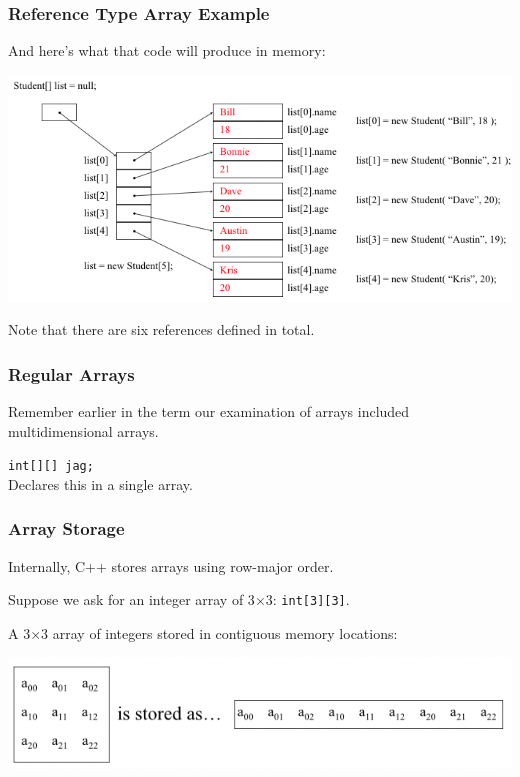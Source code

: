 \begin{frame}
\frametitle{Reference Type Array Example}

And here's what that code will produce in memory:

\begin{center}
\includegraphics[width=\textwidth]{images/students.png}
\end{center}

Note that there are six references defined in total.

\end{frame}



\begin{frame}
\frametitle{Regular Arrays}
Remember earlier in the term our examination of arrays included multidimensional arrays.

\texttt{int[][] jag;}\\
\quad Declares this in a single array.

\end{frame}



\begin{frame}
\frametitle{Array Storage}
Internally, C++ stores arrays using row-major order.

Suppose we ask for an integer array of 3$\times$3: \texttt{int[3][3]}.

A 3$\times$3 array of integers  stored in contiguous memory locations:

\begin{center}
	\includegraphics[width=\textwidth]{images/rowmajor.png}
\end{center}

\end{frame}

